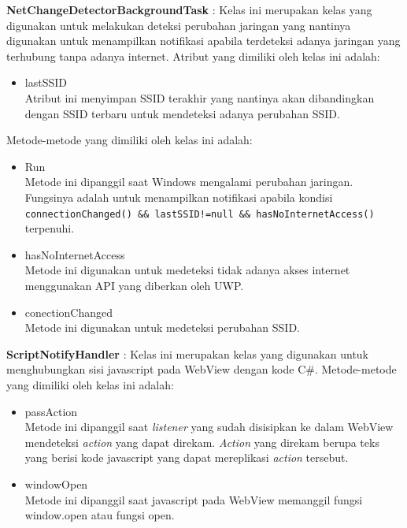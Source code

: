 \documentclass[a4paper,twoside]{article}
\begin{document}
\begin{enumerate}
\begin{itemize}
{                \textbf{NetChangeDetectorBackgroundTask} : Kelas ini merupakan kelas yang digunakan untuk melakukan deteksi perubahan jaringan yang nantinya digunakan untuk menampilkan notifikasi apabila terdeteksi adanya jaringan yang terhubung tanpa adanya internet. Atribut yang dimiliki oleh kelas ini adalah:
                \begin{itemize}
                    \item{lastSSID\\Atribut ini menyimpan SSID terakhir yang nantinya akan dibandingkan dengan SSID terbaru untuk mendeteksi adanya perubahan SSID.}
                \end{itemize}
                Metode-metode yang dimiliki oleh kelas ini adalah:
                \begin{itemize}
                    \item{Run\\Metode ini dipanggil saat Windows mengalami perubahan jaringan. Fungsinya adalah untuk menampilkan notifikasi apabila kondisi \texttt{connectionChanged() \&\& lastSSID!=null \&\& hasNoInternetAccess()} terpenuhi.}
                    \item{hasNoInternetAccess\\Metode ini digunakan untuk medeteksi tidak adanya akses internet menggunakan API yang diberkan oleh UWP.}
                    \item{conectionChanged\\Metode ini digunakan untuk medeteksi perubahan SSID.}
                \end{itemize}
                
                \textbf{ScriptNotifyHandler} : Kelas ini merupakan kelas yang digunakan untuk menghubungkan sisi javascript pada WebView dengan kode C\#. Metode-metode yang dimiliki oleh kelas ini adalah:
                \begin{itemize}
                    \item{passAction\\Metode ini dipanggil saat \textit{listener} yang sudah disisipkan ke dalam WebView mendeteksi \textit{action} yang dapat direkam. \textit{Action} yang direkam berupa teks yang berisi kode javascript yang dapat mereplikasi \textit{action} tersebut.}
                    \item{windowOpen\\Metode ini dipanggil saat javascript pada WebView memanggil fungsi window.open atau fungsi open.}
                \end{itemize}
                
}
\end{itemize}
\end{enumerate}
\end{document}

